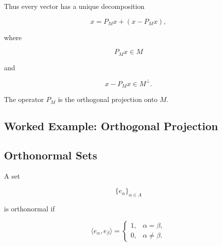Thus every vector has a unique decomposition

\[
\boxed{
x=P_Mx+(x-P_Mx),
}
\]

where

\[
P_Mx\in M
\]

and

\[
x-P_Mx\in M^\perp.
\]

The operator \(P_M\) is the orthogonal projection onto \(M\).

\subsection{Worked Example: Orthogonal Projection}
\label{subsec:worked-orthogonal-projection}


\subsection{Orthonormal Sets}
\label{subsec:orthonormal-sets}

A set

\[
\{e_\alpha\}_{\alpha\in A}
\]

is orthonormal if

\[
\boxed{
\langle e_\alpha,e_\beta\rangle
=
\begin{cases}
1, & \alpha=\beta,\\
0, & \alpha\neq\beta.
\end{cases}
}
\]


